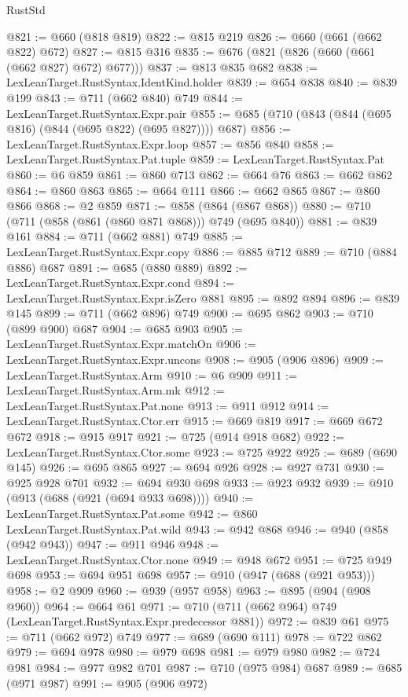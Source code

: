 \begin{lexlean}{RustStd}
\begin{coremodule}
@821 := @660 (@818 @819)
@822 := @815 @219
@826 := @660 (@661 (@662 @822) @672)
@827 := @815 @316
@835 := @676 (@821 (@826 (@660 (@661 (@662 @827) @672) @677)))
@837 := @813 @835 @682
@838 := LexLeanTarget.RustSyntax.IdentKind.holder
@839 := @654 @838
@840 := @839 @199
@843 := @711 (@662 @840) @749
@844 := LexLeanTarget.RustSyntax.Expr.pair
@855 := @685 (@710 (@843 (@844 (@695 @816) (@844 (@695 @822) (@695 @827)))) @687)
@856 := LexLeanTarget.RustSyntax.Expr.loop
@857 := @856 @840
@858 := LexLeanTarget.RustSyntax.Pat.tuple
@859 := LexLeanTarget.RustSyntax.Pat
@860 := @6 @859
@861 := @860 @713
@862 := @664 @76
@863 := @662 @862
@864 := @860 @863
@865 := @664 @111
@866 := @662 @865
@867 := @860 @866
@868 := @2 @859
@871 := @858 (@864 (@867 @868))
@880 := @710 (@711 (@858 (@861 (@860 @871 @868))) @749 (@695 @840))
@881 := @839 @161
@884 := @711 (@662 @881) @749
@885 := LexLeanTarget.RustSyntax.Expr.copy
@886 := @885 @712
@889 := @710 (@884 @886) @687
@891 := @685 (@880 @889)
@892 := LexLeanTarget.RustSyntax.Expr.cond
@894 := LexLeanTarget.RustSyntax.Expr.isZero @881
@895 := @892 @894
@896 := @839 @145
@899 := @711 (@662 @896) @749
@900 := @695 @862
@903 := @710 (@899 @900) @687
@904 := @685 @903
@905 := LexLeanTarget.RustSyntax.Expr.matchOn
@906 := LexLeanTarget.RustSyntax.Expr.uncons
@908 := @905 (@906 @896)
@909 := LexLeanTarget.RustSyntax.Arm
@910 := @6 @909
@911 := LexLeanTarget.RustSyntax.Arm.mk
@912 := LexLeanTarget.RustSyntax.Pat.none
@913 := @911 @912
@914 := LexLeanTarget.RustSyntax.Ctor.err
@915 := @669 @819
@917 := @669 @672 @672
@918 := @915 @917
@921 := @725 (@914 @918 @682)
@922 := LexLeanTarget.RustSyntax.Ctor.some
@923 := @725 @922
@925 := @689 (@690 @145)
@926 := @695 @865
@927 := @694 @926
@928 := @927 @731
@930 := @925 @928 @701
@932 := @694 @930 @698
@933 := @923 @932
@939 := @910 (@913 (@688 (@921 (@694 @933 @698))))
@940 := LexLeanTarget.RustSyntax.Pat.some
@942 := @860 LexLeanTarget.RustSyntax.Pat.wild
@943 := @942 @868
@946 := @940 (@858 (@942 @943))
@947 := @911 @946
@948 := LexLeanTarget.RustSyntax.Ctor.none
@949 := @948 @672
@951 := @725 @949 @698
@953 := @694 @951 @698
@957 := @910 (@947 (@688 (@921 @953)))
@958 := @2 @909
@960 := @939 (@957 @958)
@963 := @895 (@904 (@908 @960))
@964 := @664 @61
@971 := @710 (@711 (@662 @964) @749 (LexLeanTarget.RustSyntax.Expr.predecessor @881))
@972 := @839 @61
@975 := @711 (@662 @972) @749
@977 := @689 (@690 @111)
@978 := @722 @862
@979 := @694 @978
@980 := @979 @698
@981 := @979 @980
@982 := @724 @981
@984 := @977 @982 @701
@987 := @710 (@975 @984) @687
@989 := @685 (@971 @987)
@991 := @905 (@906 @972)

\end{coremodule}
\end{lexlean}
